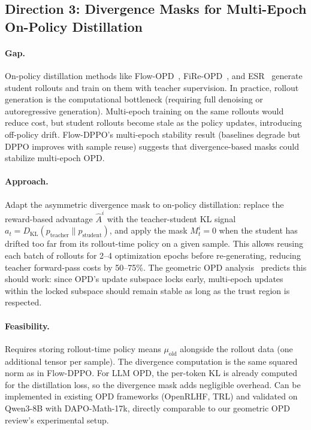 \documentclass[11pt,a4paper]{article}
\begin{document}
\subsection{Direction 3: Divergence Masks for Multi-Epoch On-Policy Distillation}

\paragraph{Gap.} On-policy distillation methods like Flow-OPD~\cite{fu2026flowopd}, FiRe-OPD~\cite{li2026fireopd}, and ESR~\cite{wang2026esr} generate student rollouts and train on them with teacher supervision. In practice, rollout generation is the computational bottleneck (requiring full denoising or autoregressive generation). Multi-epoch training on the same rollouts would reduce cost, but student rollouts become stale as the policy updates, introducing off-policy drift. Flow-DPPO's multi-epoch stability result (baselines degrade but DPPO improves with sample reuse) suggests that divergence-based masks could stabilize multi-epoch OPD.

\paragraph{Approach.} Adapt the asymmetric divergence mask to on-policy distillation: replace the reward-based advantage $\hat{A}^i$ with the teacher-student KL signal $a_t = D_{\mathrm{KL}}(p_{\mathrm{teacher}} \| p_{\mathrm{student}})$, and apply the mask $M_t^i = 0$ when the student has drifted too far from its rollout-time policy on a given sample. This allows reusing each batch of rollouts for 2--4 optimization epochs before re-generating, reducing teacher forward-pass costs by 50--75\%. The geometric OPD analysis~\cite{shen2026geometry} predicts this should work: since OPD's update subspace locks early, multi-epoch updates within the locked subspace should remain stable as long as the trust region is respected.

\paragraph{Feasibility.} Requires storing rollout-time policy means $\mu_{\mathrm{old}}$ alongside the rollout data (one additional tensor per sample). The divergence computation is the same squared norm as in Flow-DPPO. For LLM OPD, the per-token KL is already computed for the distillation loss, so the divergence mask adds negligible overhead. Can be implemented in existing OPD frameworks (OpenRLHF, TRL) and validated on Qwen3-8B with DAPO-Math-17k, directly comparable to our geometric OPD review's experimental setup.
\end{document}
